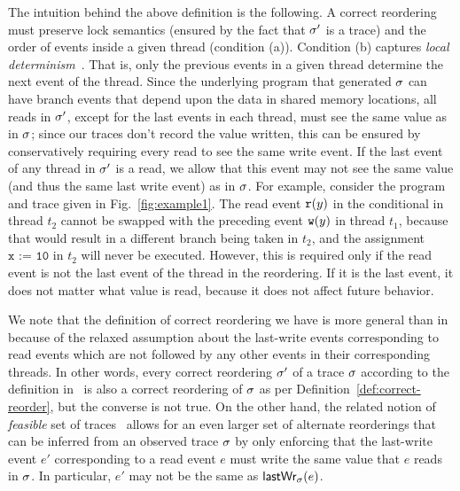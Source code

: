 %
The intuition behind the above definition is the following.  A correct
reordering must preserve lock semantics (ensured by the fact that
$\sigma'$ is a trace) and the order of events inside a given thread
(condition (a)).
Condition (b) captures \emph{local determinism}~\cite{rv2014}. 
That is, only the previous events in a given thread determine the next
event of the thread.
Since the underlying program that generated $\sigma$ can have
branch events that depend upon the data in shared memory locations,
all reads in $\sigma'$, except for the last events in each thread, 
must see the same value as in $\sigma$; since our
traces don't record the value written, this can be ensured by
conservatively requiring every read to see the same write event.
If the last event of any thread in $\sigma'$ is a read,
we allow that this event may not see the same value (and thus
the same last write event) as in $\sigma$.
For example, consider the program and trace given in
Fig.~\ref{fig:example1}. The read event $\mathtt{r}(y)$ in the conditional in
thread $t_2$ cannot be swapped with the preceding event $\mathtt{w}(y)$ in
thread $t_1$, because that would result in a different branch being
taken in $t_2$, and the assignment $\texttt{x := 10}$ in $t_2$ will
never be executed. However, this is required only if the read event is
not the last event of the thread in the reordering. If it is the last
event, it does not matter what value is read, because it does not
affect future behavior. 

We note that the definition of correct reordering we have is more general
than in~\cite{wcp2017,cp2012} because of the relaxed assumption about
the last-write events corresponding to read events which are
not followed by any other events in their corresponding threads.
In other words, every correct reordering $\sigma'$ of a trace $\sigma$
according to the definition in~\cite{cp2012,wcp2017} is also a correct reordering of $\sigma$
as per Definition~\ref{def:correct-reorder}, but the converse is not true.
On the other hand, the related notion of \emph{feasible} set of traces~\cite{rv2014}
allows for an even larger set of alternate reorderings that can be inferred
from an observed trace $\sigma$ by only enforcing that 
the last-write event $e'$ corresponding to a read event $e$
must write the same value that $e$ reads in $\sigma$. 
In particular, $e'$ may not be the same as $\mathsf{lastWr}_{\sigma}(e)$.

